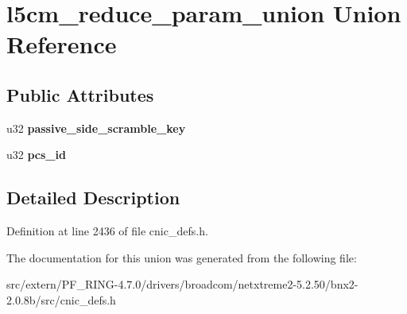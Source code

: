 \hypertarget{unionl5cm__reduce__param__union}{
\section{l5cm\_\-reduce\_\-param\_\-union Union Reference}
\label{unionl5cm__reduce__param__union}
}
\subsection*{Public Attributes}
\begin{DoxyCompactItemize}
\item 
\hypertarget{unionl5cm__reduce__param__union_af22efa242f6cad8f8b9d3a9431e8115e}{
u32 {\bfseries passive\_\-side\_\-scramble\_\-key}}
\label{unionl5cm__reduce__param__union_af22efa242f6cad8f8b9d3a9431e8115e}

\item 
\hypertarget{unionl5cm__reduce__param__union_ab0cdb72602fa2a9a30d163238fdbfeaa}{
u32 {\bfseries pcs\_\-id}}
\label{unionl5cm__reduce__param__union_ab0cdb72602fa2a9a30d163238fdbfeaa}

\end{DoxyCompactItemize}


\subsection{Detailed Description}


Definition at line 2436 of file cnic\_\-defs.h.



The documentation for this union was generated from the following file:\begin{DoxyCompactItemize}
\item 
src/extern/PF\_\-RING-\/4.7.0/drivers/broadcom/netxtreme2-\/5.2.50/bnx2-\/2.0.8b/src/cnic\_\-defs.h\end{DoxyCompactItemize}
